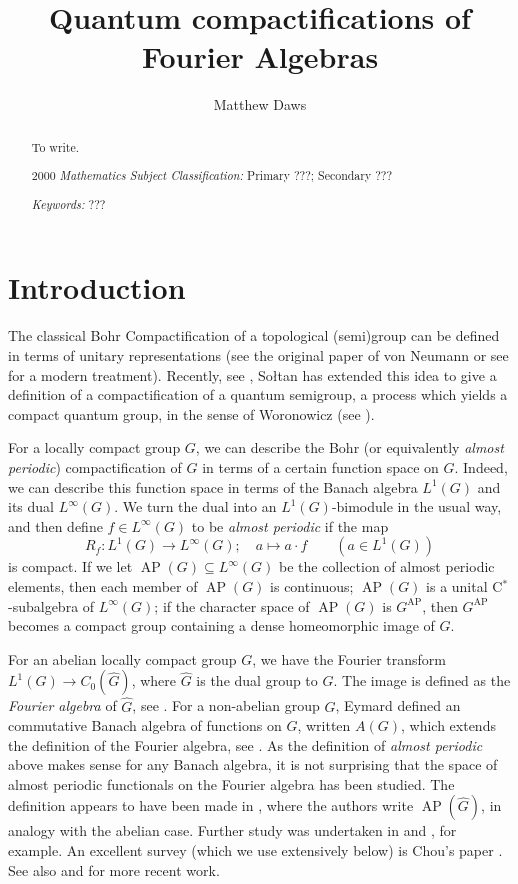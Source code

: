 \documentclass[twoside,a4paper]{article}
\theoremstyle{definition}
\theoremstyle{remark}
\newcommand{\ap}{{\operatorname{AP}}}
\begin{document}
\large
\title{Quantum compactifications of Fourier Algebras}
\author{Matthew Daws}
\maketitle

\begin{abstract}
To write.

2000 \emph{Mathematics Subject Classification:}
   Primary ???;
   Secondary ???

\emph{Keywords:} ???
\end{abstract}

\section{Introduction}

The classical Bohr Compactification of a topological (semi)group
can be defined in terms of unitary representations (see the
original paper of von Neumann \cite{vn1} or see
\cite[???]{BJM} for a modern treatment).
Recently, see \cite{soltan}, So{\l}tan has extended this idea to give
a definition of a compactification of a quantum semigroup, a
process which yields a compact quantum group, in the sense of
Woronowicz (see \cite{woro1}).

For a locally compact group $G$, we can describe the Bohr (or
equivalently \emph{almost periodic}) compactification of $G$
in terms of a certain function space on $G$.  Indeed, we can describe
this function space in terms of the Banach algebra $L^1(G)$ and
its dual $L^\infty(G)$.  We turn the dual into an $L^1(G)$-bimodule
in the usual way, and then define $f\in L^\infty(G)$ to be
\emph{almost periodic} if the map
\[ R_f:L^1(G)\rightarrow L^\infty(G); \quad
a\mapsto a\cdot f \qquad (a\in L^1(G)) \]
is compact.  If we let $\ap(G)\subseteq L^\infty(G)$ be the collection
of almost periodic elements, then each member of $\ap(G)$ is
continuous; $\ap(G)$ is a unital C$^*$-subalgebra of $L^\infty(G)$;
if the character space of $\ap(G)$ is $G^\ap$, then $G^\ap$ becomes
a compact group containing a dense homeomorphic image of $G$.

For an abelian locally compact group $G$, we have the Fourier
transform $L^1(G)\rightarrow C_0(\hat G)$, where $\hat G$ is the
dual group to $G$.  The image is defined as the \emph{Fourier algebra}
of $\hat G$, see \cite[???]{Dales}.  For a non-abelian group $G$, Eymard
defined an commutative Banach algebra of functions on $G$, written
$A(G)$, which extends the definition of the Fourier algebra, see \cite{eymard}.
As the definition of \emph{almost periodic} above makes sense for any
Banach algebra, it is not surprising that the space of almost
periodic functionals on the Fourier algebra has been studied.
The definition appears to have been made in \cite[Section~7]{DR},
where the authors write $\ap(\hat G)$, in analogy with the abelian case.
Further study was undertaken in \cite{gran1} and \cite{lau}, for example.
An excellent survey (which we use extensively below) is Chou's paper
\cite{chou}.  See also \cite{hu} and \cite{must} for more recent work.
\end{document}
